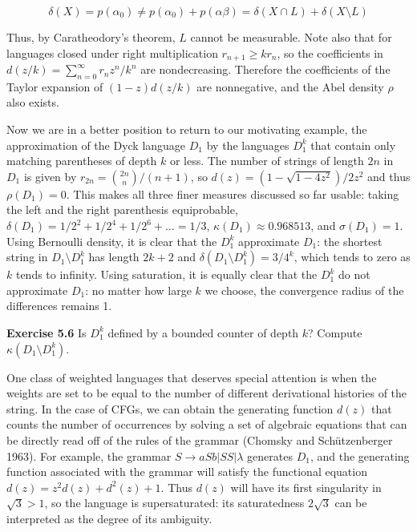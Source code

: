 \[\delta(X) = p(\alpha_0) \not= p(\alpha_0) + p(\alpha\beta) =
\delta(X \cap L) + \delta(X \setminus L) \]

\smallskip
\noindent
Thus, by Caratheodory's theorem, $L$ cannot be measurable. Note also that
for languages closed under right multiplication $r_{n+1} \geq kr_n$, so the
coefficients in $d(z/k)=\sum_{n=0}^{\infty} r_nz^n/k^n$ are nondecreasing.
Therefore the coefficients of the Taylor expansion of $(1-z)d(z/k)$ are
nonnegative, and the Abel density $\rho$ also exists.

Now we are in a better position to return to our motivating example, the
approximation of the Dyck language $D_1$ by the languages $D_1^k$ that contain
only matching parentheses of depth $k$ or less. The number of strings of
length $2n$ in $D_1$ is given by $r_{2n} = {2n\choose n}/(n+1)$, so
$d(z)=(1-\sqrt{1-4z^2})/2z^2$ and thus $\rho(D_1) = 0$. This makes all three
finer measures discussed so far usable: taking the left and the right
parenthesis equiprobable, $\delta(D_1)=1/2^2+1/2^4+1/2^6+\ldots=1/3$,
$\kappa(D_1) \approx 0.968513$, and $\sigma(D_1)=1$.  Using Bernoulli density,
it is clear that the $D_1^k$ approximate $D_1$: the shortest string in $D_1
\setminus D_1^k$ has length $2k+2$ and $\delta(D_1 \setminus D_1^k)=3/4^k$,
which tends to zero as $k$ tends to infinity. Using saturation, it is equally
clear that the $D_1^k$ do not approximate $D_1$: no matter how large $k$ we
choose, the convergence radius of the differences remains 1. 

\bigskip
\noindent
{\bf Exercise 5.6} Is $D_1^k$ defined by a bounded counter of depth $k$?
Compute $\kappa(D_1 \setminus D_1^k)$.

\bigskip
\noindent
One class of weighted languages that deserves special attention is when the
weights are set to be equal to the number of different derivational histories
of the string.  In the case of CFGs, we can obtain the generating function
$d(z)$ that counts the number of occurrences by solving a set of algebraic
equations that can be directly read off of the rules of the grammar (Chomsky
and Sch\"utzenberger 1963). For example, the grammar $S\rightarrow aSb | SS |
\lambda$ generates $D_1$, and the generating function associated with the
grammar will satisfy the functional equation $d(z)=z^2 d(z)+d^2(z) +1$. Thus
$d(z)$ will have its first singularity in $\sqrt{3} > 1$, so the language is
supersaturated: its saturatedness $2\sqrt{3}$ can be interpreted as the degree
of its ambiguity.  \nocite{Chomsky:1963} \nocite{Beauquier:1986}

